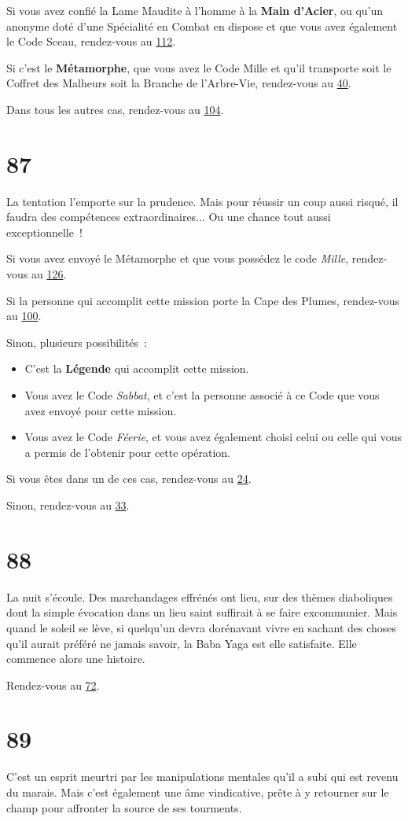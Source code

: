 \documentclass{report}
\newcommand{\gsection}[1]{
    \section{#1}
    \label{section-#1}
}
\newcommand{\glink}[1]{\hyperref[section-#1]{#1}}
\newcommand{\hero}[1]{\textbf{#1}}
\begin{document}
Si vous avez confié la Lame Maudite à l'homme à la \hero{Main d'Acier}, ou qu'un anonyme doté d'une Spécialité en Combat en dispose et que vous avez également le Code Sceau, rendez-vous au \glink{112}.

Si c'est le \hero{Métamorphe}, que vous avez le Code Mille et qu'il transporte soit le Coffret des Malheurs soit la Branche de l'Arbre-Vie, rendez-vous au \glink{40}.

Dans tous les autres cas, rendez-vous au \glink{104}.

\gsection{87}

La tentation l'emporte sur la prudence. Mais pour réussir un coup aussi risqué, il faudra des compétences extraordinaires... Ou une chance tout aussi exceptionnelle !

Si vous avez envoyé le Métamorphe et que vous possédez le code \emph{Mille}, rendez-vous au \glink{126}.

Si la personne qui accomplit cette mission porte la Cape des Plumes, rendez-vous au \glink{100}.

Sinon, plusieurs possibilités :
\begin{itemize}
\item C'est la \hero{Légende} qui accomplit cette mission.
\item Vous avez le Code \emph{Sabbat}, et c'est la personne associé à ce Code que vous avez envoyé pour cette mission.
\item Vous avez le Code \emph{Féerie}, et vous avez également choisi celui ou celle qui vous a permis de l'obtenir pour cette opération.
\end{itemize}

Si vous êtes dans un de ces cas, rendez-vous au \glink{24}.

Sinon, rendez-vous au \glink{33}.

\gsection{88}

La nuit s'écoule. Des marchandages effrénés ont lieu, sur des thèmes diaboliques dont la simple évocation dans un lieu saint suffirait à se faire excommunier. Mais quand le soleil se lève, si quelqu'un devra dorénavant vivre en sachant des choses qu'il aurait préféré ne jamais savoir, la Baba Yaga est elle satisfaite. Elle commence alors une histoire.

Rendez-vous au \glink{72}.

\gsection{89}

C'est un esprit meurtri par les manipulations mentales qu'il a subi qui est revenu du marais. Mais c'est également une âme vindicative, prête à y retourner sur le champ pour affronter la source de ses tourments.
\end{document}
